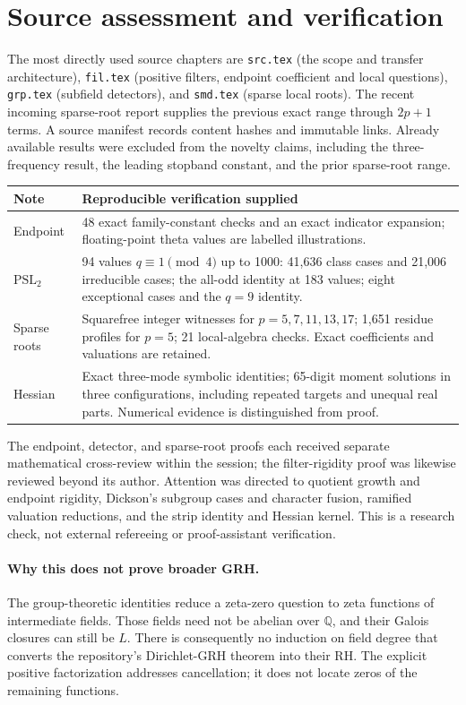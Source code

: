 \documentclass[11pt,a4paper]{article}
\begin{document}
\clearpage
\section*{Source assessment and verification}
The most directly used source chapters are \texttt{src.tex} (the scope and transfer architecture), \texttt{fil.tex} (positive filters, endpoint coefficient and local questions), \texttt{grp.tex} (subfield detectors), and \texttt{smd.tex} (sparse local roots). The recent incoming sparse-root report supplies the previous exact range through $2p+1$ terms. A source manifest records content hashes and immutable links. Already available results were excluded from the novelty claims, including the three-frequency result, the leading stopband constant, and the prior sparse-root range.

\begin{center}\small
\begin{tabularx}{\textwidth}{@{}lX@{}}\toprule
Note & Reproducible verification supplied\\\midrule
Endpoint & 48 exact family-constant checks and an exact indicator expansion; floating-point theta values are labelled illustrations.\\
$\mathrm{PSL}_2$ & 94 values $q\equiv1\pmod4$ up to 1000: 41,636 class cases and 21,006 irreducible cases; the all-odd identity at 183 values; eight exceptional cases and the $q=9$ identity.\\
Sparse roots & Squarefree integer witnesses for $p=5,7,11,13,17$; 1,651 residue profiles for $p=5$; 21 local-algebra checks. Exact coefficients and valuations are retained.\\
Hessian & Exact three-mode symbolic identities; 65-digit moment solutions in three configurations, including repeated targets and unequal real parts. Numerical evidence is distinguished from proof.\\\bottomrule
\end{tabularx}
\end{center}

The endpoint, detector, and sparse-root proofs each received separate mathematical cross-review within the session; the filter-rigidity proof was likewise reviewed beyond its author. Attention was directed to quotient growth and endpoint rigidity, Dickson's subgroup cases and character fusion, ramified valuation reductions, and the strip identity and Hessian kernel. This is a research check, not external refereeing or proof-assistant verification.

\paragraph{Why this does not prove broader GRH.}
The group-theoretic identities reduce a zeta-zero question to zeta functions of intermediate fields. Those fields need not be abelian over $\mathbb Q$, and their Galois closures can still be $L$. There is consequently no induction on field degree that converts the repository's Dirichlet-GRH theorem into their RH. The explicit positive factorization addresses cancellation; it does not locate zeros of the remaining functions.
\end{document}
